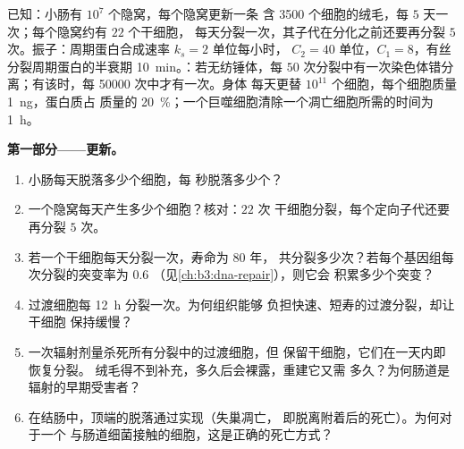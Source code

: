 \begin{problem}
\label{pb:b3:cell-cycle-apoptosis:1}
已知：小肠有 $10^{7}$ 个隐窝，每个隐窝更新一条
含 \num{3500} 个细胞的绒毛，每 $5$ 天一次；每个隐窝约有 $22$ 个干细胞，
每天分裂一次，其子代在分化之前还要再分裂
$5$ 次。振子：周期蛋白合成速率 $k_{s} = 2$ 单位每小时，
$C_{2} = 40$ 单位，$C_{1} = 8$，有丝分裂周期蛋白的半衰期
\qty{10}{min}。：若无纺锤体，每
$50$ 次分裂中有一次染色体错分离；有该时，每 \num{50000} 次中才有一次。身体
每天更替 $10^{11}$ 个细胞，每个细胞质量 \qty{1}{ng}，蛋白质占
质量的 \qty{20}{\%}；一个巨噬细胞清除一个凋亡细胞所需的时间为
\qty{1}{h}。

\medskip
\noindent\textbf{第一部分——更新。}
\begin{enumerate}
  \item 小肠每天脱落多少个细胞，每
        秒脱落多少个？
  \item 一个隐窝每天产生多少个细胞？核对：$22$ 次
        干细胞分裂，每个定向子代还要再分裂 $5$
        次。
  \item 若一个干细胞每天分裂一次，寿命为 $80$ 年，
        共分裂多少次？若每个基因组每次分裂的突变率为 $0.6$
        （见\cref{ch:b3:dna-repair}），则它会
        积累多少个突变？
  \item 过渡细胞每 \qty{12}{h} 分裂一次。为何组织能够
        负担快速、短寿的过渡分裂，却让干细胞
        保持缓慢？
  \item 一次辐射剂量杀死所有分裂中的过渡细胞，但
        保留干细胞，它们在一天内即恢复分裂。
        绒毛得不到补充，多久后会裸露，重建它又需
        多久？为何肠道是辐射的早期受害者？
  \item 在结肠中，顶端的脱落通过实现（失巢凋亡，
        即脱离附着后的死亡）。为何对于一个
        与肠道细菌接触的细胞，这是正确的死亡方式？
\end{enumerate}


\end{problem}
